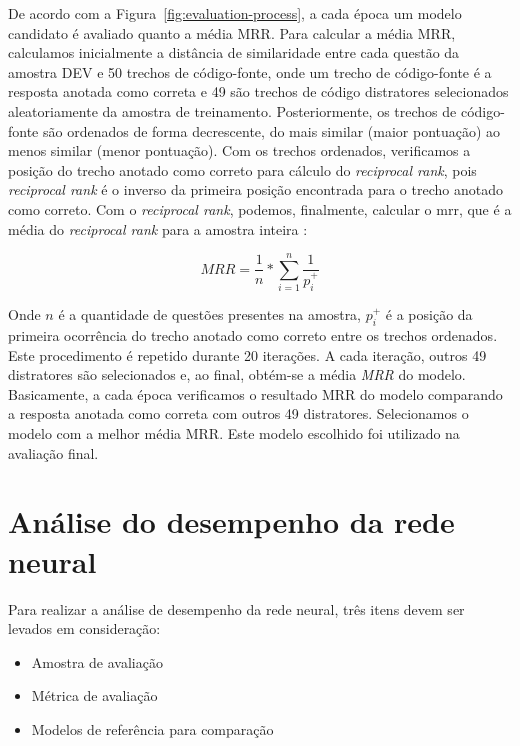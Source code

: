 De acordo com a Figura~\ref{fig:evaluation-process}, a cada época um modelo candidato é avaliado quanto a média MRR. Para calcular a média MRR, calculamos inicialmente a distância de similaridade entre cada questão da amostra DEV e 50 trechos de código-fonte, onde um trecho de código-fonte é a resposta anotada como correta e 49 são trechos de código distratores selecionados aleatoriamente da amostra de treinamento.  Posteriormente, os trechos de código-fonte são ordenados de forma decrescente, do mais similar (maior pontuação) ao menos similar (menor pontuação). Com os trechos ordenados, verificamos a posição do trecho anotado como correto para cálculo do \textit{reciprocal rank}, pois \textit{reciprocal rank} é o inverso da primeira posição encontrada para o trecho anotado como correto. Com o \textit{reciprocal rank}, podemos, finalmente, calcular o \acrshort{mrr}, que é a média do \textit{reciprocal rank} para a amostra inteira \cite{Gu-deep-code-search:2018}:

\begin{equation}\label{eq:mrr}
MRR = \frac{1}{n} * \sum_{i = 1}^{n}\frac{1}{p_{i}^{+}}    
\end{equation}

Onde $n$ é a quantidade de questões presentes na amostra, $p_{i}^{+}$ é a posição da primeira ocorrência do trecho anotado como correto entre os trechos ordenados. Este procedimento é repetido durante 20 iterações. A cada iteração, outros 49 distratores são selecionados e, ao final, obtém-se a média \emph{MRR} do modelo. Basicamente, a cada época verificamos o resultado MRR do modelo comparando a resposta anotada como correta com outros 49 distratores. Selecionamos o modelo com a melhor média MRR. Este modelo escolhido foi utilizado na avaliação final.





\section{Análise do desempenho da rede neural}
\label{sec:analise-do-desempenho-da-rede-neural}

Para realizar a análise de desempenho da rede neural, três itens devem ser levados em consideração:

\begin{itemize}
    \item Amostra de avaliação
    \item Métrica de avaliação
    \item Modelos de referência para comparação
\end{itemize}

